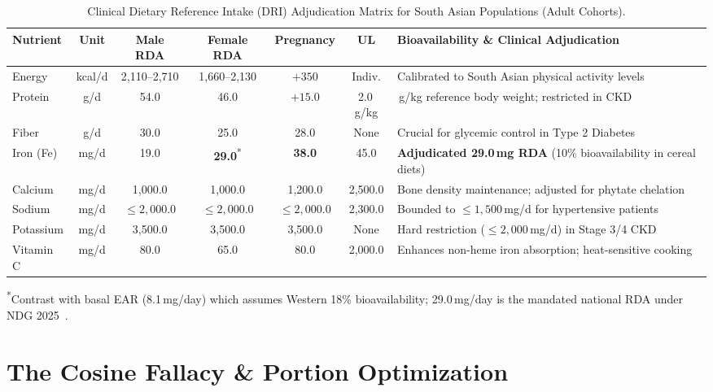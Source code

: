 \documentclass[5p,times,twocolumn]{elsarticle}
\begin{document}
\begin{table}[!t]
\centering
\caption{Clinical Dietary Reference Intake (DRI) Adjudication Matrix for South Asian Populations (Adult Cohorts).}
\label{tab:dri_matrix}
\footnotesize
\begin{tabularx}{\textwidth}{lccccc>{\raggedright\arraybackslash}X}
\toprule
\textbf{Nutrient} & \textbf{Unit} & \textbf{Male RDA} & \textbf{Female RDA} & \textbf{Pregnancy} & \textbf{UL} & \textbf{Bioavailability \& Clinical Adjudication} \\
\midrule
Energy & kcal/d & 2,110--2,710 & 1,660--2,130 & $+350$ & Indiv. & Calibrated to South Asian physical activity levels~\cite{bdnac2023} \\
Protein & g/d & 54.0 & 46.0 & $+15.0$ & 2.0\,g/kg & 0.83\,g/kg reference body weight; restricted in CKD \\
Fiber & g/d & 30.0 & 25.0 & 28.0 & None & Crucial for glycemic control in Type 2 Diabetes \\
Iron (Fe) & mg/d & 19.0 & \textbf{29.0}\textsuperscript{*} & \textbf{38.0} & 45.0 & \textbf{Adjudicated 29.0\,mg RDA} (10\% bioavailability in cereal diets) \\
Calcium & mg/d & 1,000.0 & 1,000.0 & 1,200.0 & 2,500.0 & Bone density maintenance; adjusted for phytate chelation \\
Sodium & mg/d & $\le 2,000.0$ & $\le 2,000.0$ & $\le 2,000.0$ & 2,300.0 & Bounded to $\le 1,500$\,mg/d for hypertensive patients \\
Potassium & mg/d & 3,500.0 & 3,500.0 & 3,500.0 & None & Hard restriction ($\le 2,000$\,mg/d) in Stage 3/4 CKD \\
Vitamin C & mg/d & 80.0 & 65.0 & 80.0 & 2,000.0 & Enhances non-heme iron absorption; heat-sensitive cooking \\
\bottomrule
\end{tabularx}

\smallskip
{\footnotesize \textsuperscript{*}Contrast with basal EAR (8.1\,mg/day) which assumes Western 18\% bioavailability; 29.0\,mg/day is the mandated national RDA under NDG 2025~\cite{bdnac2023}.}
\end{table}

\section{The Cosine Fallacy \& Portion Optimization}
\label{sec:portion_optimization}
\end{document}
